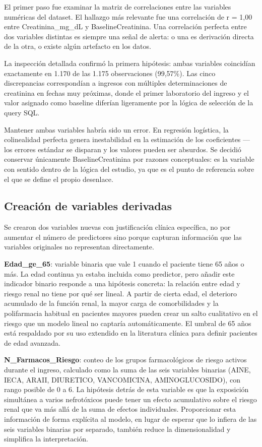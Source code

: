 \documentclass[12pt, a4paper, oneside]{report}
\begin{document}
El primer paso fue examinar la matriz de correlaciones entre las variables numéricas del dataset. El hallazgo más relevante fue una correlación de r = 1,00 entre Creatinina\_mg\_dL y BaselineCreatinina. Una correlación perfecta entre dos variables distintas es siempre una señal de alerta: o una es derivación directa de la otra, o existe algún artefacto en los datos.

La inspección detallada confirmó la primera hipótesis: ambas variables coincidían exactamente en 1.170 de las 1.175 observaciones (99,57\%). Las cinco discrepancias correspondían a ingresos con múltiples determinaciones de creatinina en fechas muy próximas, donde el primer laboratorio del ingreso y el valor asignado como baseline diferían ligeramente por la lógica de selección de la query SQL.

Mantener ambas variables habría sido un error. En regresión logística, la colinealidad perfecta genera inestabilidad en la estimación de los coeficientes —los errores estándar se disparan y los valores pueden ser absurdos. Se decidió conservar únicamente BaselineCreatinina por razones conceptuales: es la variable con sentido dentro de la lógica del estudio, ya que es el punto de referencia sobre el que se define el propio desenlace.

\subsection{Creación de variables derivadas}

Se crearon dos variables nuevas con justificación clínica específica, no por aumentar el número de predictores sino porque capturan información que las variables originales no representan directamente.

\textbf{Edad\_ge\_65}: variable binaria que vale 1 cuando el paciente tiene 65 años o más. La edad continua ya estaba incluida como predictor, pero añadir este indicador binario responde a una hipótesis concreta: la relación entre edad y riesgo renal no tiene por qué ser lineal. A partir de cierta edad, el deterioro acumulado de la función renal, la mayor carga de comorbilidades y la polifarmacia habitual en pacientes mayores pueden crear un salto cualitativo en el riesgo que un modelo lineal no captaría automáticamente. El umbral de 65 años está respaldado por su uso extendido en la literatura clínica para definir pacientes de edad avanzada.

\textbf{N\_Farmacos\_Riesgo}: conteo de los grupos farmacológicos de riesgo activos durante el ingreso, calculado como la suma de las seis variables binarias (AINE, IECA, ARAII, DIURETICO, VANCOMICINA, AMINOGLUCOSIDO), con rango posible de 0 a 6. La hipótesis detrás de esta variable es que la exposición simultánea a varios nefrotóxicos puede tener un efecto acumulativo sobre el riesgo renal que va más allá de la suma de efectos individuales. Proporcionar esta información de forma explícita al modelo, en lugar de esperar que lo infiera de las seis variables binarias por separado, también reduce la dimensionalidad y simplifica la interpretación.
\end{document}
